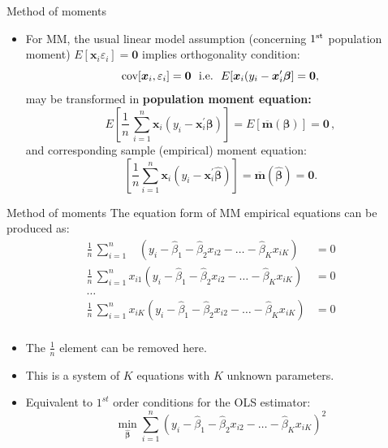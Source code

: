 \documentclass{beamer}
\begin{document}
\begin{frame}{Method of moments}
\begin{itemize}

\item For MM, the usual linear model assumption (concerning $1^{\textnormal{st}}$ population moment) $E[\bm{x}_i \varepsilon_i]=\bm{0}$ implies orthogonality condition: $$\textnormal{cov}[\bm{x}_i, \varepsilon_i] = \bm{0} \textnormal{~~i.e.~~}E[\bm{x}_i(y_i-\bm{x}_i^{\prime}\bm{\beta}]=\bm{0},$$ 
may be transformed in \textbf{population moment equation:}
$$
E \left[ \frac{1}{n} \, \sum_{i=1}^n \bm{x}_i (y_i - \bm{x}_i^{\prime}\bm{\beta}) \right] 
= E \left[ \overline{\bm{m}}(\bm{\beta}) \right] = \bm{0}\,,
$$
and corresponding sample (empirical) moment equation:
$$
\left[ \frac{1}{n} \sum_{i=1}^n \bm{x}_i (y_i - \bm{x}_i^{\prime}\hat{\bm{\beta}}) \right]
= \overline{\bm{m}}(\hat{\bm{\beta}}) = \bm{0}.
$$
\end{itemize}
\end{frame}
\begin{frame}{Method of moments}
The equation form of MM empirical equations can be produced as:
\medskip
\footnotesize
\begin{equation*}
\begin{aligned}
\frac{1}{n}\, \sum_{i=1}^n ~~~~\left( y_i - \hat{\beta}_1 - \hat{\beta}_2 x_{i2} - \dots - \hat{\beta}_K x_{iK} \right) &= 0\\
\frac{1}{n}\, \sum_{i=1}^n  x_{i1} \left( y_i - \hat{\beta}_1 - \hat{\beta}_2 x_{i2} - \dots - \hat{\beta}_K x_{iK} \right) &= 0\\
\dots &\\
\frac{1}{n}\, \sum_{i=1}^n x_{iK} \left( y_i - \hat{\beta}_1 - \hat{\beta}_2 x_{i2} - \dots - \hat{\beta}_K x_{iK} \right) &= 0\\
\end{aligned}
\end{equation*}
\medskip
\begin{itemize}
    \item The $\frac{1}{n}$ element can be removed here.
    \item This is a system of $K$ equations with $K$ unknown parameters.
    \item Equivalent to $1^{st}$ order conditions for the OLS estimator:
    $$ \underset{\hat{\bm{\beta}}}{\min}\sum_{i=1}^n \left( y_i - \hat{\beta}_1 - \hat{\beta}_2 x_{i2} - \dots - \hat{\beta}_K x_{iK} \right)^2$$
\end{itemize}
\end{frame}
\end{document}
